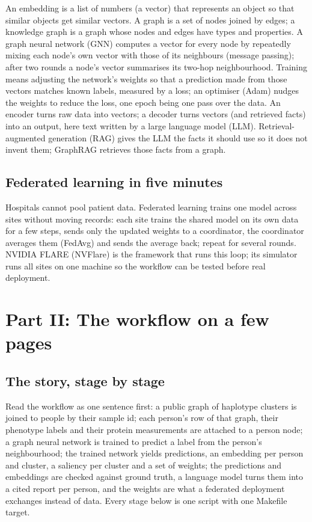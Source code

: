 \documentclass[11pt,a4paper]{article}
\begin{document}
An embedding is a list of numbers (a vector) that represents an object so that similar objects get similar vectors. A graph is a set of nodes joined by edges; a knowledge graph is a graph whose nodes and edges have types and properties. A graph neural network (GNN) computes a vector for every node by repeatedly mixing each node's own vector with those of its neighbours (message passing); after two rounds a node's vector summarises its two-hop neighbourhood. Training means adjusting the network's weights so that a prediction made from those vectors matches known labels, measured by a loss; an optimiser (Adam) nudges the weights to reduce the loss, one epoch being one pass over the data. An encoder turns raw data into vectors; a decoder turns vectors (and retrieved facts) into an output, here text written by a large language model (LLM). Retrieval-augmented generation (RAG) gives the LLM the facts it should use so it does not invent them; GraphRAG retrieves those facts from a graph.

\subsection{Federated learning in five minutes}

Hospitals cannot pool patient data. Federated learning trains one model across sites without moving records: each site trains the shared model on its own data for a few steps, sends only the updated weights to a coordinator, the coordinator averages them (FedAvg) and sends the average back; repeat for several rounds. NVIDIA FLARE (NVFlare) is the framework that runs this loop; its simulator runs all sites on one machine so the workflow can be tested before real deployment.

\section{Part II: The workflow on a few pages}

\subsection{The story, stage by stage}

Read the workflow as one sentence first: a public graph of haplotype clusters is joined to people by their sample id; each person's row of that graph, their phenotype labels and their protein measurements are attached to a person node; a graph neural network is trained to predict a label from the person's neighbourhood; the trained network yields predictions, an embedding per person and cluster, a saliency per cluster and a set of weights; the predictions and embeddings are checked against ground truth, a language model turns them into a cited report per person, and the weights are what a federated deployment exchanges instead of data. Every stage below is one script with one Makefile target.
\end{document}
